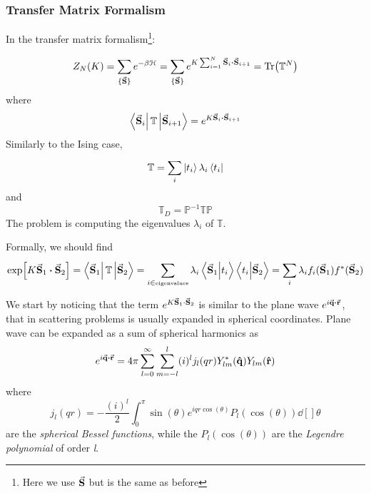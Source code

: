 \documentclass[../../Main/Main.tex]{subfiles}
\begin{document}
\subsubsection*{Transfer Matrix Formalism}






In the transfer matrix formalism\footnote{Here we use $\va{S}$ but is the same as before}:

\begin{equation}
  Z_N (K) = \sum_{\{ \va{S} \}  }^{} e^{-\beta \mathcal{H}} = \sum_{\{ \va{S} \}  }^{} e^{K \sum_{i=1}^{N} \va{S}_i \vdot \va{S}_{i+1} } = \Tr(\mathbb{T}^N)
\end{equation}
where 
\begin{equation*}
\bra{\va{S}_i} \mathbb{T} \ket{\va{S}_{i+1}} = e^{K \va{S}_i \vdot \va{S}_{i+1}} 
\end{equation*}
Similarly to the Ising case, 
\begin{equation*}
  \mathbb{T} = \sum_{i}^{} \ket{t_i} \lambda _i \bra{t_i}
\end{equation*}
and
\begin{equation*}
  \mathbb{T}_D = \mathbb{P}^{-1} \mathbb{T}\mathbb{P}
\end{equation*}
The problem is computing the eigenvalues \( \lambda _i \) of \( \mathbb{T} \).

Formally, we should find
\begin{equation*}
  \exp [K \va{S}_1\vdot \va{S}_{2}] = \bra{\va{S}_1} \mathbb{T} \ket{\va{S}_2} = \sum_{i \in \text{\tiny eigenvalues}}^{} \lambda _i \braket{\va{S}_1}{t_i}  \braket{t_i}{\va{S}_2}
  = \sum_{i}^{} \lambda _i f_i ( \va{S}_1) f^* (\va{S}_2)
\end{equation*}

\begin{remark}
  We start by noticing that the term \( e^{K \va{S}_1 \cdot \va{S}_2}  \) is similar to the plane wave \(e^{i \va{q}\vdot \va{r}}  \), that in scattering problems is usually expanded in spherical coordinates. Plane wave can be expanded as a sum of spherical harmonics as
  \begin{equation*}
    e^{i \va{q}\vdot \va{r}} = 4 \pi \sum_{l=0}^{\infty } \sum_{m=-l}^{l} (i)^l j_l (qr) Y_{lm}^* (\vu{q}) Y_{lm} (\vu{r})
  \end{equation*}
  where
  \begin{equation*}
    j_l (qr) = - \frac{(i)^l}{2} \int_{0}^{\pi} \sin(\theta ) e^{i q r \cos(\theta ) } P_l (\cos(\theta ) ) \dd[]{\theta }
  \end{equation*}
  are the \emph{spherical Bessel functions}, while  the \( P_l (\cos(\theta ) ) \) are the \emph{Legendre polynomial} of order \emph{l}.
\end{remark}
\end{document}
